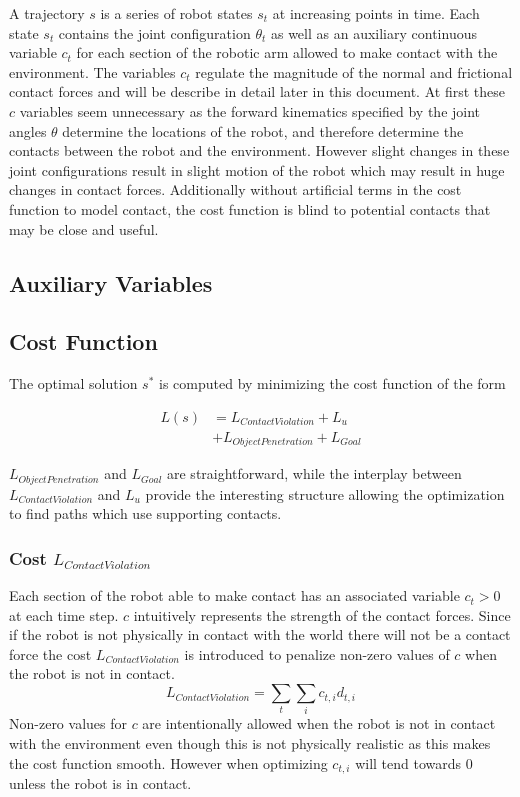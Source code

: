 \documentclass[../thesis.tex]{subfiles}
\begin{document}
A trajectory $s$ is a series of robot states $s_t$ at increasing points in time. Each state $s_t$ contains the joint configuration $\theta_t$ as well as an auxiliary continuous variable $c_t$ for each section of the robotic arm allowed to make contact with the environment. The variables $c_t$ regulate the magnitude of the normal and frictional contact forces and will be describe in detail later in this document. At first these $c$ variables seem unnecessary as the forward kinematics specified by the joint angles $\theta$ determine the locations of the robot, and therefore determine the contacts between the robot and the environment. However slight changes in these joint configurations result in slight motion of the robot which may result in huge changes in contact forces. Additionally without artificial terms in the cost function to model contact, the cost function is blind to potential contacts that may be close and useful.

\subsection{Auxiliary Variables}

\subsection{Cost Function}
The optimal solution $s^*$ is computed by minimizing the cost function of the form

\begin{align*}
L(s) &= L_{Contact Violation} + L_{u} \\
&+ L_{Object Penetration} + L_{Goal}   
\end{align*}
    
$L_{Object Penetration}$ and $L_{Goal}$ are straightforward, while the interplay between $L_{Contact Violation}$ and $L_u$ provide the interesting structure allowing the optimization to find paths which use supporting contacts.




\subsubsection{Cost $L_{Contact Violation}$}
Each section of the robot able to make contact has an associated variable $c_t > 0$ at each time step. $c$ intuitively represents the strength of the contact forces. Since if the robot is not physically in contact with the world there will not be a contact force the cost $L_{Contact Violation}$ is introduced to penalize non-zero values of $c$ when the robot is not in contact. 
$$L_{Contact Violation} = \sum_t{\sum_i{c_{t,i} d_{t,i}}}$$
Non-zero values for $c$ are intentionally allowed when the robot is not in contact with the environment even though this is not physically realistic as this makes the cost function smooth. However when optimizing $c_{t,i}$ will tend towards 0 unless the robot is in contact.
\end{document}
